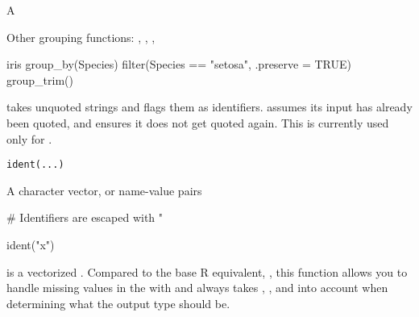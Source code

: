 \documentclass[a4paper]{book}
\begin{document}
%
\begin{Value}
A 
\end{Value}
%
\begin{SeeAlso}
Other grouping functions: 
,
,
,
\end{SeeAlso}
%
\begin{Examples}
\begin{ExampleCode}
iris %
  group_by(Species) %
  filter(Species == "setosa", .preserve = TRUE) %
  group_trim()
\end{ExampleCode}
\end{Examples}
%
\begin{Description}
 takes unquoted strings and flags them as identifiers.
 assumes its input has already been quoted, and ensures
it does not get quoted again. This is currently used only for
.
\end{Description}
%
\begin{Usage}
\begin{verbatim}
ident(...)
\end{verbatim}
\end{Usage}
%
\begin{Arguments}
\begin{ldescription}
\item[\code{...}] A character vector, or name-value pairs
\end{ldescription}
\end{Arguments}
%
\begin{Examples}
\begin{ExampleCode}
# Identifiers are escaped with "

ident("x")

\end{ExampleCode}
\end{Examples}
%
\begin{Description}
 is a vectorized . Compared to the base R equivalent,
, this function allows you to handle missing values in the
 with  and always takes , , and 
into account when determining what the output type should be.
\end{Description}
\end{document}
